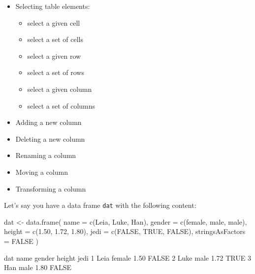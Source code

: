 \documentclass[
]{book}
\newenvironment{Shaded}{\begin{snugshade}}{\end{snugshade}}
\newcommand{\AttributeTok}[1]{\textcolor[rgb]{0.77,0.63,0.00}{#1}}
\newcommand{\ConstantTok}[1]{\textcolor[rgb]{0.00,0.00,0.00}{#1}}
\newcommand{\DecValTok}[1]{\textcolor[rgb]{0.00,0.00,0.81}{#1}}
\newcommand{\FloatTok}[1]{\textcolor[rgb]{0.00,0.00,0.81}{#1}}
\newcommand{\FunctionTok}[1]{\textcolor[rgb]{0.00,0.00,0.00}{#1}}
\newcommand{\NormalTok}[1]{#1}
\newcommand{\OtherTok}[1]{\textcolor[rgb]{0.56,0.35,0.01}{#1}}
\newcommand{\StringTok}[1]{\textcolor[rgb]{0.31,0.60,0.02}{#1}}
\providecommand{\tightlist}{%
  \setlength{\itemsep}{0pt}\setlength{\parskip}{0pt}}
\begin{document}
\begin{itemize}
\tightlist
\item
  Selecting table elements:

  \begin{itemize}
  \tightlist
  \item
    select a given cell
  \item
    select a set of cells
  \item
    select a given row
  \item
    select a set of rows
  \item
    select a given column
  \item
    select a set of columns
  \end{itemize}
\item
  Adding a new column
\item
  Deleting a new column
\item
  Renaming a column
\item
  Moving a column
\item
  Transforming a column
\end{itemize}

Let's say you have a data frame \texttt{dat} with the following content:

\begin{Shaded}
\begin{Highlighting}[]
\NormalTok{dat }\OtherTok{\textless{}{-}} \FunctionTok{data.frame}\NormalTok{(}
  \AttributeTok{name =} \FunctionTok{c}\NormalTok{(}\StringTok{\textquotesingle{}Leia\textquotesingle{}}\NormalTok{, }\StringTok{\textquotesingle{}Luke\textquotesingle{}}\NormalTok{, }\StringTok{\textquotesingle{}Han\textquotesingle{}}\NormalTok{),}
  \AttributeTok{gender =} \FunctionTok{c}\NormalTok{(}\StringTok{\textquotesingle{}female\textquotesingle{}}\NormalTok{, }\StringTok{\textquotesingle{}male\textquotesingle{}}\NormalTok{, }\StringTok{\textquotesingle{}male\textquotesingle{}}\NormalTok{),}
  \AttributeTok{height =} \FunctionTok{c}\NormalTok{(}\FloatTok{1.50}\NormalTok{, }\FloatTok{1.72}\NormalTok{, }\FloatTok{1.80}\NormalTok{),}
  \AttributeTok{jedi =} \FunctionTok{c}\NormalTok{(}\ConstantTok{FALSE}\NormalTok{, }\ConstantTok{TRUE}\NormalTok{, }\ConstantTok{FALSE}\NormalTok{),}
  \AttributeTok{stringsAsFactors =} \ConstantTok{FALSE}
\NormalTok{)}

\NormalTok{dat}
\NormalTok{  name gender height  jedi}
\DecValTok{1}\NormalTok{ Leia female   }\FloatTok{1.50} \ConstantTok{FALSE}
\DecValTok{2}\NormalTok{ Luke   male   }\FloatTok{1.72}  \ConstantTok{TRUE}
\DecValTok{3}\NormalTok{  Han   male   }\FloatTok{1.80} \ConstantTok{FALSE}
\end{Highlighting}
\end{Shaded}
\end{document}
